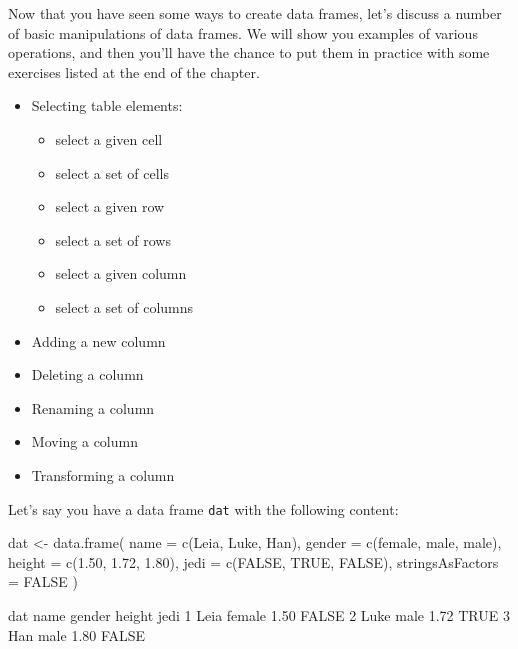 \documentclass[
]{book}
\newenvironment{Shaded}{\begin{snugshade}}{\end{snugshade}}
\newcommand{\AttributeTok}[1]{\textcolor[rgb]{0.77,0.63,0.00}{#1}}
\newcommand{\ConstantTok}[1]{\textcolor[rgb]{0.00,0.00,0.00}{#1}}
\newcommand{\DecValTok}[1]{\textcolor[rgb]{0.00,0.00,0.81}{#1}}
\newcommand{\FloatTok}[1]{\textcolor[rgb]{0.00,0.00,0.81}{#1}}
\newcommand{\FunctionTok}[1]{\textcolor[rgb]{0.00,0.00,0.00}{#1}}
\newcommand{\NormalTok}[1]{#1}
\newcommand{\OtherTok}[1]{\textcolor[rgb]{0.56,0.35,0.01}{#1}}
\newcommand{\StringTok}[1]{\textcolor[rgb]{0.31,0.60,0.02}{#1}}
\providecommand{\tightlist}{%
  \setlength{\itemsep}{0pt}\setlength{\parskip}{0pt}}
\begin{document}
Now that you have seen some ways to create data frames, let's discuss a number
of basic manipulations of data frames. We will show you examples of various
operations, and then you'll have the chance to put them in practice with some
exercises listed at the end of the chapter.

\begin{itemize}
\tightlist
\item
  Selecting table elements:

  \begin{itemize}
  \tightlist
  \item
    select a given cell
  \item
    select a set of cells
  \item
    select a given row
  \item
    select a set of rows
  \item
    select a given column
  \item
    select a set of columns
  \end{itemize}
\item
  Adding a new column
\item
  Deleting a column
\item
  Renaming a column
\item
  Moving a column
\item
  Transforming a column
\end{itemize}

Let's say you have a data frame \texttt{dat} with the following content:

\begin{Shaded}
\begin{Highlighting}[]
\NormalTok{dat }\OtherTok{\textless{}{-}} \FunctionTok{data.frame}\NormalTok{(}
  \AttributeTok{name =} \FunctionTok{c}\NormalTok{(}\StringTok{\textquotesingle{}Leia\textquotesingle{}}\NormalTok{, }\StringTok{\textquotesingle{}Luke\textquotesingle{}}\NormalTok{, }\StringTok{\textquotesingle{}Han\textquotesingle{}}\NormalTok{),}
  \AttributeTok{gender =} \FunctionTok{c}\NormalTok{(}\StringTok{\textquotesingle{}female\textquotesingle{}}\NormalTok{, }\StringTok{\textquotesingle{}male\textquotesingle{}}\NormalTok{, }\StringTok{\textquotesingle{}male\textquotesingle{}}\NormalTok{),}
  \AttributeTok{height =} \FunctionTok{c}\NormalTok{(}\FloatTok{1.50}\NormalTok{, }\FloatTok{1.72}\NormalTok{, }\FloatTok{1.80}\NormalTok{),}
  \AttributeTok{jedi =} \FunctionTok{c}\NormalTok{(}\ConstantTok{FALSE}\NormalTok{, }\ConstantTok{TRUE}\NormalTok{, }\ConstantTok{FALSE}\NormalTok{),}
  \AttributeTok{stringsAsFactors =} \ConstantTok{FALSE}
\NormalTok{)}

\NormalTok{dat}
\NormalTok{  name gender height  jedi}
\DecValTok{1}\NormalTok{ Leia female   }\FloatTok{1.50} \ConstantTok{FALSE}
\DecValTok{2}\NormalTok{ Luke   male   }\FloatTok{1.72}  \ConstantTok{TRUE}
\DecValTok{3}\NormalTok{  Han   male   }\FloatTok{1.80} \ConstantTok{FALSE}
\end{Highlighting}
\end{Shaded}
\end{document}
